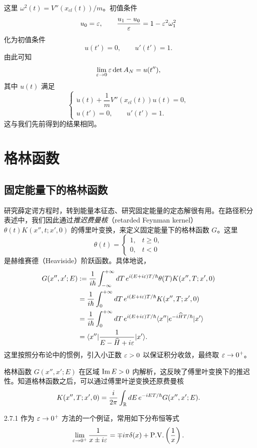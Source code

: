 这里 $\omega^2(t)=V''(x_{cl}(t))/m$。初值条件
\[
u_0=\varepsilon,\qquad \frac{u_1-u_0}{\varepsilon}=1-\varepsilon^2\omega_1^2
\]
化为初值条件
\[
u(t')=0,\qquad u'(t')=1.
\]
由此可知
\[
\lim_{\varepsilon\to0}\varepsilon\det A_N=u(t''),
\]
其中 $u(t)$ 满足
\[
\begin{cases}
\ddot u(t)+\dfrac1m V''(x_{cl}(t))u(t)=0,\\[2mm]
u(t')=0,\qquad u'(t')=1.
\end{cases}
\]
这与我们先前得到的结果相同。


\section{格林函数}

\subsection{固定能量下的格林函数}

研究薛定谔方程时，转到能量本征态、研究固定能量的定态解很有用。在路径积分表述中，我们因此通过\emph{推迟费曼核}（retarded Feynman kernel）$\theta(t)K(x'',t;x',0)$ 的傅里叶变换，来定义固定能量下的格林函数 $G$。这里
\[
\theta(t)=\begin{cases}1,& t\ge0,\\ 0,& t<0\end{cases}
\]
是赫维赛德（Heaviside）阶跃函数。具体地说，
\[
\begin{aligned}
G(x'',x';E)
&:=\frac1{i\hbar}\int_{-\infty}^{+\infty}d T\,
e^{i(E+i\varepsilon)T/\hbar}\theta(T)K(x'',T;x',0)\\
&=\frac1{i\hbar}\int_0^{+\infty}d T\,
e^{i(E+i\varepsilon)T/\hbar}K(x'',T;x',0)\\
&=\frac1{i\hbar}\int_0^{+\infty}d T\,
e^{i(E+i\varepsilon)T/\hbar}\langle x''|e^{-i\widehat{H}T/\hbar}|x'\rangle\\
&=\langle x''|\frac1{E-\widehat{H}+i\varepsilon}|x'\rangle.
\end{aligned}
\]
这里按照分布论中的惯例，引入小正数 $\varepsilon>0$ 以保证积分收敛，最终取 $\varepsilon\to0^+$。

格林函数 $G(x'',x';E)$ 在区域 $\operatorname{Im} E>0$ 内解析，这反映了傅里叶变换下的推迟性。知道格林函数之后，可以通过傅里叶逆变换还原费曼核
\[
K(x'',T;x',0)=\frac{i}{2\pi}\int_{\mathbb{R}}d E\,
e^{-i ET/\hbar}G(x'',x';E).
\]

\begin{remark}{2.7.1}
  作为 $\varepsilon\to0^+$ 方法的一个例证，常用如下分布恒等式
  \[
  \lim_{\varepsilon\to0^+}\frac1{x\pm i\varepsilon}
  =\mp i\pi\delta(x)+\mathrm{P.V.}\left(\frac1x\right).
  \]
\end{remark}


